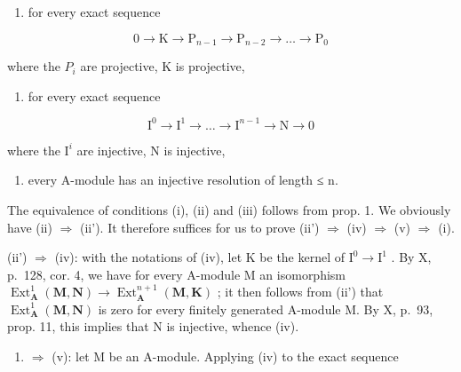 \begin{enumerate}
\def\labelenumi{(\roman{enumi})}
\setcounter{enumi}{2}
\tightlist
\item
  for every exact sequence
\end{enumerate}

\[
0 \rightarrow \mathrm{K} \rightarrow \mathrm{P} _ {n - 1} \rightarrow \mathrm{P} _ {n - 2} \rightarrow \dots \rightarrow \mathrm{P} _ {0}
\]

where the \(P_{i}\) are projective, K is projective,

\begin{enumerate}
\def\labelenumi{(\roman{enumi})}
\setcounter{enumi}{3}
\tightlist
\item
  for every exact sequence
\end{enumerate}

\[
\mathrm{I} ^ {0} \rightarrow \mathrm{I} ^ {1} \rightarrow \dots \rightarrow \mathrm{I} ^ {n - 1} \rightarrow \mathrm{N} \rightarrow 0
\]

where the \(\mathrm{I}^{i}\) are injective, N is injective,

\begin{enumerate}
\def\labelenumi{(\alph{enumi})}
\setcounter{enumi}{21}
\tightlist
\item
  every A-module has an injective resolution of length ≤ n.
\end{enumerate}

The equivalence of conditions (i), (ii) and (iii) follows from prop. 1. We obviously have (ii) \(\Rightarrow\) (ii'). It therefore suffices for us to prove (ii') \(\Rightarrow\) (iv) \(\Rightarrow\) (v) \(\Rightarrow\) (i).

(ii') \(\Rightarrow\) (iv): with the notations of (iv), let K be the kernel of \(\mathrm{I}^{0} \to \mathrm{I}^{1}\) . By X, p.~128, cor. 4, we have for every A-module M an isomorphism \(\operatorname{Ext}_{\mathbf{A}}^{1}(\mathbf{M}, \mathbf{N}) \to \operatorname{Ext}_{\mathbf{A}}^{n+1}(\mathbf{M}, \mathbf{K})\) ; it then follows from (ii') that \(\operatorname{Ext}_{\mathbf{A}}^{1}(\mathbf{M}, \mathbf{N})\) is zero for every finitely generated A-module M. By X, p.~93, prop. 11, this implies that N is injective, whence (iv).

\begin{enumerate}
\def\labelenumi{(\roman{enumi})}
\setcounter{enumi}{3}
\tightlist
\item
  \(\Rightarrow\) (v): let M be an A-module. Applying (iv) to the exact sequence
\end{enumerate}

